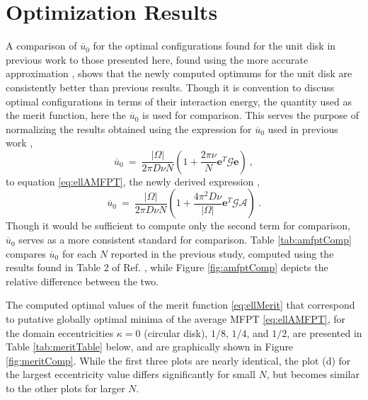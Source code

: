 \documentclass[11pt,letter,subeqn,fleqn]{article}
\newcommand{\es}{\ = \ }
\newcommand{\amfpt}{\overline{u}_0} %
\newcommand{\greenMat}{\mathcal{G}} %
\newcommand{\vecA}{\mathcal{A}}     %
\newcommand{\vecE}{\textbf{e}}      %
\newcommand{\domMeas}{|\Omega|}     %
\newcommand{\ecc}{\kappa}
\newcommand{\wardTab}{2 }
\begin{document}
\section{Optimization Results} \label{sec:results}

A comparison of $\amfpt$ for the optimal configurations found for the unit disk in previous work \cite{kolokolnikov2005optimizing} to those presented here, found using the more accurate approximation \cite{iyaniwura2020optimization}, shows that the newly computed optimums for the unit disk are consistently better than previous results. Though it is convention to discuss optimal configurations in terms of their interaction energy, the quantity used as the merit function, here the $\amfpt$ is used for comparison. This serves the purpose of normalizing the results obtained using the expression for $\amfpt$ used in previous work \cite{kolokolnikov2005optimizing},
\begin{equation}
\amfpt \es \dfrac{\domMeas}{2\pi D\nu N}\left( 1 + \dfrac{2\pi \nu}{N} \vecE^{T}\greenMat\vecE \right) \ ,
\end{equation}
to equation \eqref{eq:ellAMFPT}, the newly derived expression \cite{iyaniwura2020optimization},
\begin{equation}
\amfpt \es \dfrac{\domMeas}{2\pi D\nu N}\left( 1 + \dfrac{4\pi^2 D \nu}{\domMeas}\vecE^{T}\greenMat \vecA \right) \ .
\end{equation}
Though it would be sufficient to compute only the second term for comparison, $\amfpt$ serves as a more consistent standard for comparison. Table \ref{tab:amfptComp} compares $\amfpt$ for each $N$ reported in the previous study, computed using the results found in Table \wardTab of Ref. \cite{kolokolnikov2005optimizing}, while Figure \ref{fig:amfptComp} depicts the relative difference between the two.

The computed optimal values of the merit function \eqref{eq:ellMerit} that correspond to putative globally optimal minima of the average MFPT \eqref{eq:ellAMFPT}, for the domain eccentricities $\ecc = 0$ (circular disk), $1/8$, $1/4$, and $1/2$, are presented in Table \ref{tab:meritTable} below, and are graphically shown in Figure \ref{fig:meritComp}. While the first three plots are nearly identical, the plot (d) for the largest eccentricity value differs significantly for small $N$, but becomes similar to the other plots for larger $N$.
\end{document}
